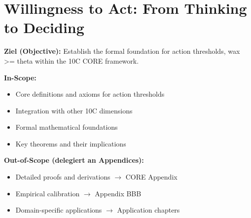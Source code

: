 %
%
%
%
%

\chapter{Willingness to Act: From Thinking to Deciding}
\label{ch:willingness}

\begin{tcolorbox}[
    colback=purple!5!white,
    colframe=purple!75!black,
    title={\textbf{Chapter Scope: Ziel / In-Scope / Out-of-Scope}},
    fonttitle=\bfseries
]

\textbf{Ziel (Objective):}
Establish the formal foundation for action thresholds, wax >= theta within the 10C CORE framework.

\vspace{0.3cm}
\textbf{In-Scope:}
\begin{itemize}[nosep]
    \item Core definitions and axioms for action thresholds
    \item Integration with other 10C dimensions
    \item Formal mathematical foundations
    \item Key theorems and their implications
\end{itemize}

\vspace{0.3cm}
\textbf{Out-of-Scope (delegiert an Appendices):}
\begin{itemize}[nosep]
    \item Detailed proofs and derivations $\rightarrow$ CORE Appendix
    \item Empirical calibration $\rightarrow$ Appendix BBB
    \item Domain-specific applications $\rightarrow$ Application chapters
\end{itemize}

\end{tcolorbox}



